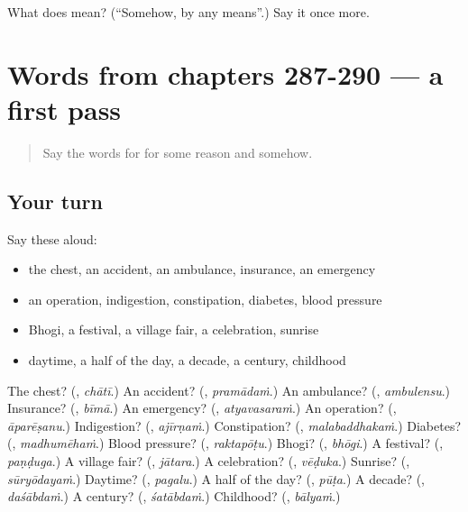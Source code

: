 \begin{tcolorbox}[breakable,colback=teal!4,colframe=teal!35!black,title={Before you move on}]
What does  mean? (\textquotedblleft{}Somehow, by any means\textquotedblright{}.) Say it once more.
\end{tcolorbox}
\section[(dialogue)]{Words from chapters 287-290 — a first pass}

\label{lesson:TE-R295-first-pass-words-from-chapters-287-290}



\begin{quote}
Say the words for for some reason and somehow.
\end{quote}

\subsection*{Your turn}
Say these aloud:

\begin{itemize}
\raggedright
  \item the chest, an accident, an ambulance, insurance, an emergency
  \item an operation, indigestion, constipation, diabetes, blood pressure
  \item Bhogi, a festival, a village fair, a celebration, sunrise
  \item daytime, a half of the day, a decade, a century, childhood
\end{itemize}

\begin{tcolorbox}[breakable,colback=teal!4,colframe=teal!35!black,title={Before you move on}]
The chest? (\textbf{}, \emph{chātī}.) An accident? (\textbf{}, \emph{pramādaṁ}.) An ambulance? (\textbf{}, \emph{ambulensu}.) Insurance? (\textbf{}, \emph{bīmā}.) An emergency? (\textbf{}, \emph{atyavasaraṁ}.) An operation? (\textbf{}, \emph{āparēṣanu}.) Indigestion? (\textbf{}, \emph{ajīrṇaṁ}.) Constipation? (\textbf{}, \emph{malabaddhakaṁ}.) Diabetes? (\textbf{}, \emph{madhumēhaṁ}.) Blood pressure? (\textbf{}, \emph{raktapōṭu}.) Bhogi? (\textbf{}, \emph{bhōgi}.) A festival? (\textbf{}, \emph{paṇḍuga}.) A village fair? (\textbf{}, \emph{jātara}.) A celebration? (\textbf{}, \emph{vēḍuka}.) Sunrise? (\textbf{}, \emph{sūryōdayaṁ}.) Daytime? (\textbf{}, \emph{pagalu}.) A half of the day? (\textbf{}, \emph{pūṭa}.) A decade? (\textbf{}, \emph{daśābdaṁ}.) A century? (\textbf{}, \emph{śatābdaṁ}.) Childhood? (\textbf{}, \emph{bālyaṁ}.)
\end{tcolorbox}
